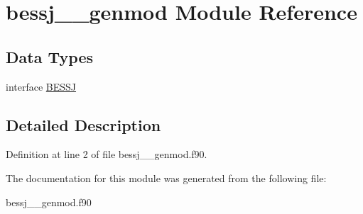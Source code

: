 \hypertarget{classbessj____genmod}{\section{bessj\+\_\+\+\_\+genmod Module Reference}
\label{classbessj____genmod}
}
\subsection*{Data Types}
\begin{DoxyCompactItemize}
\item 
interface \hyperlink{interfacebessj____genmod_1_1_b_e_s_s_j}{B\+E\+S\+S\+J}
\end{DoxyCompactItemize}


\subsection{Detailed Description}


Definition at line 2 of file bessj\+\_\+\+\_\+genmod.\+f90.



The documentation for this module was generated from the following file\+:\begin{DoxyCompactItemize}
\item 
bessj\+\_\+\+\_\+genmod.\+f90\end{DoxyCompactItemize}
